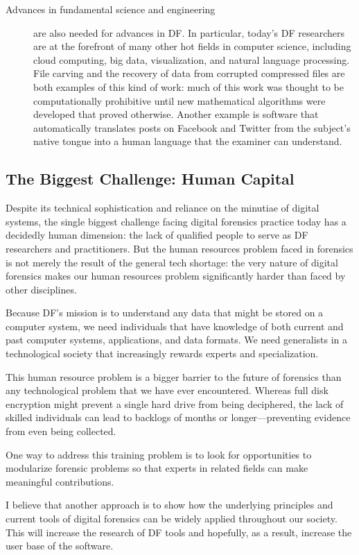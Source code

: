 \begin{description}
\item[Advances in fundamental science and engineering] are also needed
  for advances in DF. In particular, today's DF researchers are at the
  forefront of many other hot fields in computer science, including
  cloud computing, big data, visualization, and natural language
  processing. File carving and the recovery of data from corrupted
  compressed files are both examples of this kind of work: much of
  this work was thought to be computationally prohibitive until new
  mathematical algorithms were developed that proved
  otherwise. Another example is software that automatically translates
  posts on Facebook and Twitter from the subject's native tongue into
  a human language that the examiner can understand.
\end{description}


\subsection{The Biggest Challenge: Human Capital}

Despite its technical sophistication and reliance on the minutiae of
digital systems, the single biggest challenge facing digital forensics
practice today has a decidedly human dimension: the lack of qualified
people to serve as DF researchers and practitioners. But the human
resources problem faced in forensics is not merely the result of the
general tech shortage: the very nature of digital forensics makes our
human resources problem significantly harder than faced by other
disciplines. 

Because DF's mission is
to understand any data that might be stored on a computer
system, we need individuals that have knowledge
of both current and past computer systems, applications, and data
formats. We need generalists in a technological society that
increasingly rewards experts and specialization. 

This human resource problem is a bigger barrier to the
future of forensics than 
any technological problem that we have ever encountered. Whereas full
disk encryption might prevent a single hard drive from being
deciphered, the lack of skilled individuals can lead to backlogs of
months or longer---preventing evidence from even being collected.

One way to address this training problem is to look for opportunities
to modularize forensic problems so that experts in related fields can
make meaningful contributions. 

I believe that another approach is to show how the underlying
principles and current tools of digital forensics can be widely
applied throughout our society. This will increase the research of DF
tools and hopefully, as a result, increase the user base of the software.

